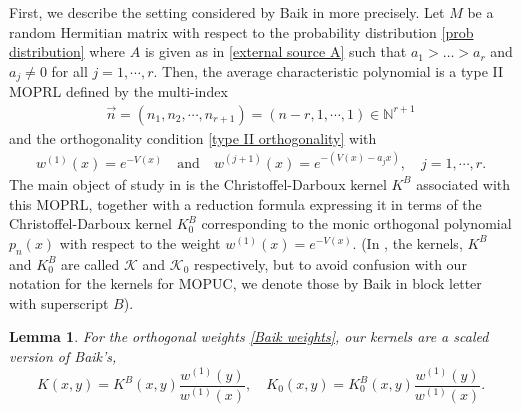 \documentclass[a4paper,10pt,leqno]{amsart}
\numberwithin{equation}{section}
\newtheorem{lemma}[theorem]{Lemma}
\theoremstyle{remark}
\newcommand{\N}{\mathbb{N}}
\newcommand{\red}[1]{{\color{red} #1}}
\begin{document}
First, we describe the setting considered by Baik in \cite{Bai09} more precisely. Let $M$ be a random Hermitian matrix with respect to the probability distribution \eqref{prob distribution} where $A$ is given as in \eqref{external source A} such that $a_1 > \dots > a_r$ and $a_j \neq 0$ for all $j = 1, \cdots, r$.
Then, the average characteristic polynomial is a type II MOPRL defined by the multi-index
\begin{align} \label{Baik vector}
\vec{n} = (n_1, n_2, \cdots, n_{r+1}) = (n-r, 1, \cdots, 1) \in \N^{r+1}
\end{align}
and the orthogonality condition \eqref{type II orthogonality} with 
\begin{align} \label{Baik weights}
w^{(1)}(x) = e^{-V(x)} \quad \text{and} \quad w^{(j+1)}(x) = e^{-(V(x) - a_j x)}, \quad j=1,\cdots,r.
\end{align} 
The main object of study in \cite{Bai09} is the Christoffel-Darboux kernel $K^{B}$ associated with this MOPRL, together with a reduction formula expressing it in terms of the Christoffel-Darboux kernel $K^{B}_{0}$ corresponding to the monic orthogonal polynomial $p_n(x)$ with respect to the weight $w^{(1)}(x)=e^{-V(x)}$.
(In \cite{Bai09}, the kernels, $K^B$ and $K^B_{0}$ are called $\mathcal K$ and $\mathcal K_0$ respectively, but to avoid confusion with our notation for the kernels for MOPUC, we denote those by Baik in block letter with superscript $B$).

\begin{lemma}
For the orthogonal weights \eqref{Baik weights}, %
our kernels are a scaled version of Baik's,
\begin{equation} \label{kernel comparison}
  K(x,y) = K^B(x,y) \dfrac{w^{(1)}(y)}{w^{(1)}(x)}, \quad K_0(x,y) = K^B_{0}(x,y) \dfrac{w^{(1)}(y)}{w^{(1)}(x)}.
\end{equation}
\end{lemma}
\end{document}

